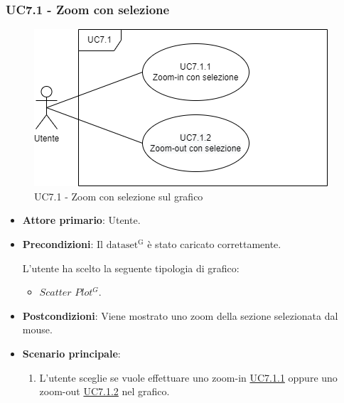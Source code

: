 \newpage
\subsubsection{UC7.1 - Zoom con selezione}
\label{sec:UC7.1}
\begin{figure}[h!]
    \centering
    \includegraphics[scale=0.60]{../../assets/UC7.1.png}
    \caption{UC7.1 - Zoom con selezione sul grafico}
\end{figure}
\begin{itemize}
    \item \textbf{Attore primario}: Utente.
    \item \textbf{Precondizioni}: Il ${\mathrm{dataset^{G}}}$ è stato caricato correttamente. \par L'utente ha scelto la seguente tipologia di grafico:
    \begin{itemize}
    		\item $Scatter$ $Plot^{G}$.
    \end{itemize}
    \item \textbf{Postcondizioni}: Viene mostrato uno zoom della sezione selezionata dal mouse.
    \item \textbf{Scenario principale}:
          \begin{enumerate}
              \item L'utente sceglie se vuole effettuare uno zoom-in \hyperref[sec:UC7.1.1]{UC7.1.1} oppure uno zoom-out \hyperref[sec:UC7.1.2]{UC7.1.2} nel grafico.
          \end{enumerate}
\end{itemize}

